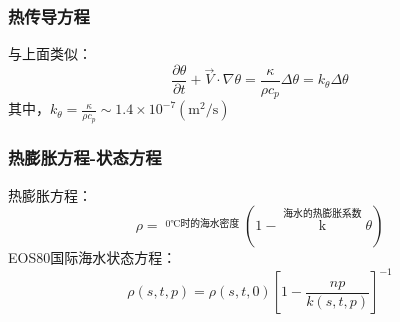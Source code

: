 \documentclass[a4paper,12pt]{article}
\begin{document}
    \subsubsection{热传导方程}
    与上面类似：
    \[
        \frac{\partial \theta}{\partial t}+\vec{V} \cdot \nabla \theta=\frac{\kappa}{\rho c_{p}} \Delta \theta=k_{\theta} \Delta \theta
    \]
    其中，$\displaystyle k_{\theta}=\frac{\kappa}{\rho c_{p}} \sim 1.4 \times 10^{-7}\left(\mathrm{m}^{2} / \mathrm{s}\right)$
    \subsubsection{热膨胀方程-状态方程}
    热膨胀方程：
    \[
        \rho=\mathop{\rho_0}\limits^{\mbox{0℃时的海水密度}}(1-\mathop{k} \limits^{\mbox{海水的热膨胀系数}} \theta)
    \]
    EOS80国际海水状态方程：
    \[
        \rho(s, t, p)=\rho(s, t, 0)\left[1-\frac{n p}{k(s, t, p)}\right]^{-1}
    \]
\end{document}
